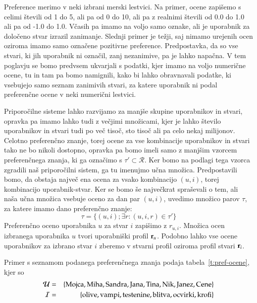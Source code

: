 Preference merimo v neki izbrani merski lestvici. Na primer, ocene zapišemo s celimi števili od 1 do 5, ali pa od 0 do 10, ali pa z realnimi števili od 0.0 do 1.0 ali pa od -1.0 do 1.0. Včasih pa imamo na voljo samo oznake, ali je uporabnik za določeno stvar izrazil zanimanje. Slednji primer je težji, saj nimamo urejenih ocen oziroma imamo samo označene pozitivne preference. Predpostavka, da so vse stvari, ki jih uporabnik ni označil, zanj nezanimive, pa je lahko napačna. V tem poglavju se bomo predvsem ukvarjali s podatki, kjer imamo na voljo numerične ocene, tu in tam pa bomo namignili, kako bi lahko obravnavali podatke, ki vsebujejo samo seznam zanimivih stvari, za katere uporabnik ni podal preferenčne ocene v neki numerični lestvici.

Priporočilne sisteme lahko razvijamo za manjše skupine uporabnikov in stvari, opravka pa imamo lahko tudi z večjimi množicami, kjer je lahko število uporabnikov in stvari tudi po več tisoč, sto tisoč ali pa celo nekaj milijonov. Celotno preferenčno znanje, torej ocene za vse kombinacije uporabnikov in stvari tako ne bo nikoli dostopno, opravka pa bomo imeli samo z manjšim vzorcem preferenčnega znanja, ki ga označimo s $\tau'\subset\mathcal{R}$. Ker bomo na podlagi tega vzorca zgradili naš priporočilni sistem, ga tu imenujmo učna množica. Predpostavili bomo, da obstaja največ ena ocena za vsako kombinacijo $(u, i)$, torej kombinacijo uporabnik-stvar. Ker se bomo še največkrat spraševali o tem, ali naša učna množica vsebuje oceno za dan par $(u,i)$, uvedimo množico parov $\tau$, za katere imamo dano preferenčno znanje:
%
$$\tau=\{(u,i); \exists r:(u,i,r)\in\tau'\}$$
%
Preferenčno oceno uporabnika $u$ za stvar $i$ zapišimo z $r_{u,i}$. Množica ocen izbranega uporabnika $u$ tvori uporabniški profil ${\bf r}_u$. Podobno lahko vse ocene uporabnikov za izbrano stvar $i$ zberemo v stvarni profil oziroma profil stvari ${\bf r}_i$.

Primer s seznamom podanega preferenčnega znanja podaja tabela~\ref{t:pref-ocene}, kjer so
\begin{eqnarray}
{\mathcal U} & = & \{ {\rm Mojca}, {\rm Miha}, {\rm Sandra}, {\rm Jana}, {\rm Tina}, {\rm Nik}, {\rm Janez}, {\rm Cene} \} \nonumber \\
{\mathcal I} & = & \{ {\rm olive}, {\rm vampi}, {\rm testenine}, {\rm blitva}, {\rm ocvirki}, {\rm krofi} \} \nonumber
\end{eqnarray}


